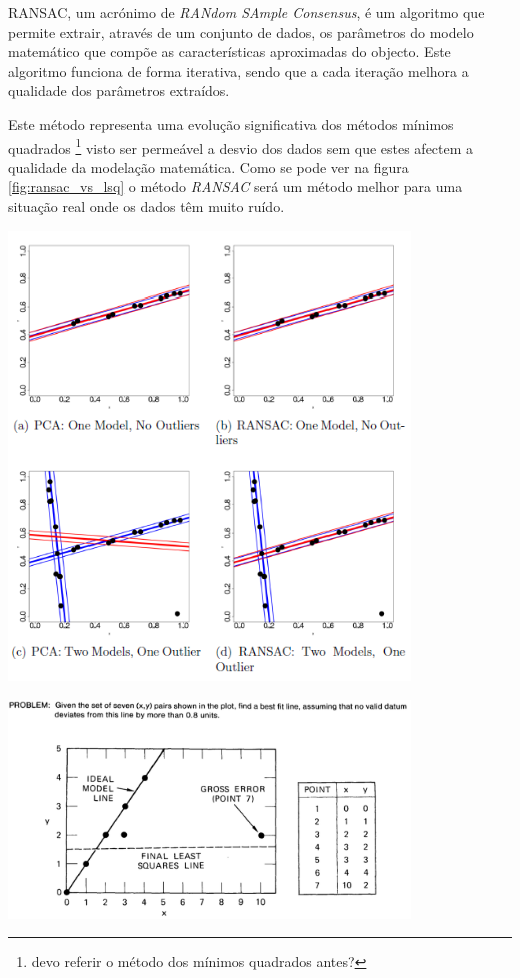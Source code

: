 RANSAC\cite{Fischler:1981:RSC:358669.358692}, um acrónimo de \emph{RANdom SAmple Consensus},
é um algoritmo que permite extrair, através de um conjunto de dados, os parâmetros
do modelo matemático que compõe as características aproximadas do objecto. Este algoritmo 
funciona de forma iterativa, sendo que a cada iteração melhora a qualidade dos parâmetros extraídos.

Este método representa uma evolução significativa dos métodos mínimos quadrados 
\footnote{devo referir o método dos mínimos quadrados antes?} visto ser
permeável a desvio dos dados sem que estes afectem a qualidade da modelação matemática.
Como se pode ver na figura \ref{fig:ransac_vs_lsq} o método \emph{RANSAC} será um método
melhor para uma situação real onde os dados têm muito ruído.


\begin{center}
	\includegraphics[width=0.80\textwidth]{figures/least_squares_vs_ransac.png}
	\label{fig:ransac_vs_lsq}
\end{center}



\begin{center}
	\includegraphics[width=0.80\textwidth]{figures/least_squares_shortcomings.png}
	\label{fig:ransac}
\end{center}


